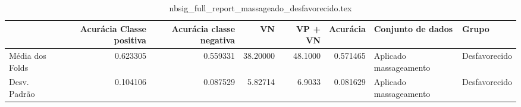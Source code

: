 \begin{table}
\centering
\caption{nbsig_full_report_massageado_desfavorecido.tex}
\label{nbsig_full_report_massageado_desfavorecido.tex}
\begin{tabular}{lrrrrrll}
\toprule
{} &  Acurácia Classe positiva &  Acurácia classe negativa &       VN  &  VP + VN  &  Acurácia &       Conjunto de dados &          Grupo \\
\midrule
Média dos Folds &                  0.623305 &                  0.559331 &  38.20000 &   48.1000 &  0.571465 &  Aplicado massageamento &  Desfavorecido \\
Desv. Padrão    &                  0.104106 &                  0.087529 &   5.82714 &    6.9033 &  0.081629 &  Aplicado massageamento &  Desfavorecido \\
\bottomrule
\end{tabular}
\end{table}
